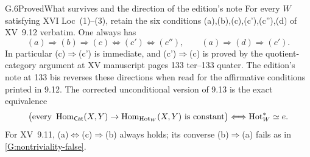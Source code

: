 \begin{claim}{G.6}{Proved}{What survives and the direction of the edition's note}
\label{G:ccprime}
For every $W$ satisfying XVI Loc~(1)--(3), retain the six conditions
(a),(b),(c),(c'),(c''),(d) of XV~9.12 verbatim.  One always has
\[
 (a)\Longrightarrow(b)\Longrightarrow(c)
 \Longleftrightarrow(c')\Longleftrightarrow(c''),
 \qquad (a)\Longrightarrow(d)\Longrightarrow(c').
\]
In particular (c)$\Rightarrow$(c') is immediate, and
(c')$\Rightarrow$(c) is proved by the quotient-category argument at
XV manuscript pages 133 ter--133 quater.  The edition's note at
133 bis reverses these directions when read for the affirmative
conditions printed in 9.12.  The corrected unconditional version of
9.13 is the exact equivalence
\[
 \bigl(\text{every }\operatorname{Hom}_{\mathsf{Cat}}(X,Y)\to\operatorname{Hom}_{\operatorname{Hot}_W}(X,Y)
          \text{ is constant}\bigr)
 \Longleftrightarrow \operatorname{Hot}_W^*\simeq e.
\]
For XV~9.11, (a)$\Longleftrightarrow$(c)$\Longrightarrow$(b) always
holds; its converse (b)$\Rightarrow$(a) fails as in \ref{G:nontriviality-false}.
\end{claim}
